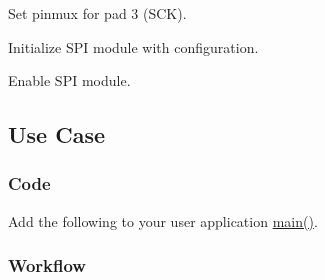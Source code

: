 \begin{DoxyEnumerate}
\begin{DoxyEnumerate}
\item Set pinmux for pad 3 (S\+CK). 
\begin{DoxyCodeInclude}{0}
\end{DoxyCodeInclude}

\item Initialize S\+PI module with configuration. 
\begin{DoxyCodeInclude}{0}
\end{DoxyCodeInclude}

\item Enable S\+PI module. 
\begin{DoxyCodeInclude}{0}
\end{DoxyCodeInclude}
 
\end{DoxyEnumerate}
\end{DoxyEnumerate}\hypertarget{asfdoc_sam0_sercom_spi_slave_basic_use_asfdoc_sam0_sercom_spi_slave_basic_use_case}{}\subsection{Use Case}\label{asfdoc_sam0_sercom_spi_slave_basic_use_asfdoc_sam0_sercom_spi_slave_basic_use_case}
\hypertarget{asfdoc_sam0_sercom_spi_slave_basic_use_asfdoc_sam0_sercom_spi_slave_basic_use_case_code}{}\subsubsection{Code}\label{asfdoc_sam0_sercom_spi_slave_basic_use_asfdoc_sam0_sercom_spi_slave_basic_use_case_code}
Add the following to your user application {\ttfamily \mbox{\hyperlink{csc__app_8c_a840291bc02cba5474a4cb46a9b9566fe}{main()}}}. 
\begin{DoxyCodeInclude}{0}
\end{DoxyCodeInclude}
\hypertarget{asfdoc_sam0_sercom_spi_slave_basic_use_asfdoc_sam0_sercom_spi_slave_basic_use_case_workflow}{}\subsubsection{Workflow}\label{asfdoc_sam0_sercom_spi_slave_basic_use_asfdoc_sam0_sercom_spi_slave_basic_use_case_workflow}


